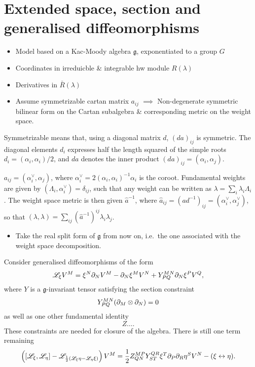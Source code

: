 \documentclass{article}
\begin{document}
\section{Extended space, section and generalised diffeomorphisms}
\begin{itemize}
    \item Model based on a Kac-Moody algebra $\mathfrak{g}$, exponentiated to a group $G$
    \item Coordinates in irreduicble \& integrable hw module $R(\lambda)$ 
    \item Derivatives in $\bar{R}(\lambda)$
    \item Assume symmetrizable cartan matrix $a_{ij}$
    \subitem $\implies$ Non-degenerate symmetric bilinear form on the Cartan subalgebra \& corresponding metric on the weight space.
\end{itemize}

Symmetrizable means that, using a diagonal matrix $d$, $(da)_{ij}$ is symmetric. The diagonal elements $d_i$ expresses half the length squared of the simple roots $d_i = (\alpha_i,\alpha_i)/2$, and $da$ denotes the inner product $(da)_{ij}=(\alpha_i,\alpha_j)$. 

$a_{ij}=(\alpha_i^\vee,\alpha_j)$, where $\alpha_i^\vee=2(\alpha_i,\alpha_i)^{-1}\alpha_i$ is the coroot. Fundamental weights are given by $(\Lambda_i,\alpha_i^{\vee})=\delta_{ij}$, such that any weight can be written as $\lambda = \sum_i \lambda_i\Lambda_i$. The weight space metric is then given $\hat{a}^{-1}$, where $\hat{a}_{ij} = (ad^{-1})_{ij}=(\alpha_i^{\vee},\alpha_j^{\vee})$, so that $(\lambda,\lambda)=\sum_{ij}(\hat{a}^{-1})^{ij}\lambda_i\lambda_j$.
\begin{itemize}
    \item Take the real split form of $\mathfrak{g}$ from now on, i.e.\ the one associated with the weight space decomposition.
\end{itemize}

Consider generalised diffeomorphisms of the form 
\begin{equation}
    \mathscr{L}_\xi V^M = \xi^N\partial_N V^M-\partial_N\xi^M V^N+Y^{MN}_{PQ}\partial_N\xi^PV^Q,
\end{equation}
where $Y$ is a $\mathfrak{g}$-invariant tensor satisfying the section constraint 
\begin{equation}
    Y^{MN}_{PQ}(\partial_M\otimes\partial_N)=0
\end{equation}
as well as one other fundamental identity
\begin{equation}
    Z\ldots.
\end{equation}
These constraints are needed for closure of the algebra. There is still one term remaining 
\begin{equation}
    \left([\mathscr{L}_\xi,\mathscr{L}_\eta]-\mathscr{L}_{\frac{1}{2}(\mathscr{L}_\xi\eta-\mathscr{L}_\eta \xi)}\right)V^M = \frac{1}{2}Z^{MP}_{QN}Y^{QR}_{ST}\xi^T\partial_P\partial_R\eta^SV^N-(\xi\leftrightarrow \eta).
\end{equation}
\end{document}
